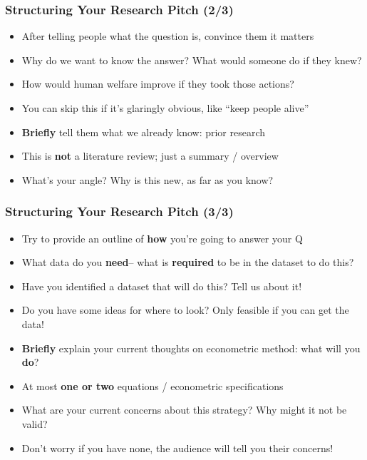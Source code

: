 \documentclass[aspectratio=169]{beamer}
\begin{document}
\begin{frame}
\frametitle{Structuring Your Research Pitch (2/3)}

\begin{itemize}
	\item After telling people what the question is, convince them it matters
	
	\item <2->Why do we want to know the answer? What would someone do if they knew?
	
	\item <2->How would human welfare improve if they took those actions?
	
	\item <3->You can skip this if it's glaringly obvious, like ``keep people alive''
	
	\item <4->\textbf{Briefly} tell them what we already know: prior research
	
	\item <4->This is \textbf{not} a literature review; just a summary / overview
	
	\item <5->What's your angle? Why is this new, as far as you know?
\end{itemize}
\end{frame}

\begin{frame}
\frametitle{Structuring Your Research Pitch (3/3)}

\begin{itemize}
	\item Try to provide an outline of \textbf{how} you're going to answer your Q
	
	\item <2->What data do you \textbf{need}-- what is \textbf{required} to be in the dataset to do this?
	
	\item <2->Have you identified a dataset that will do this? Tell us about it!
	
	\item <2->Do you have some ideas for where to look? Only feasible if you can get the data!
	
	\item <3->\textbf{Briefly} explain your current thoughts on econometric method: what will you \textbf{do}?
	
	\item <3->At most \textbf{one or two} equations / econometric specifications
	
	\item <4->What are your current concerns about this strategy? Why might it not be valid?
	
	\item <4->Don't worry if you have none, the audience will tell you their concerns!
\end{itemize}
\end{frame}
\end{document}
